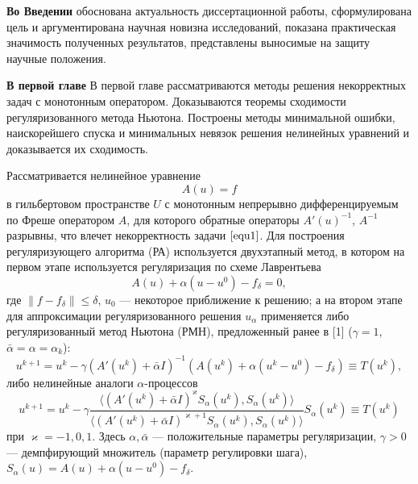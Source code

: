 \documentclass[%
autoref,     %
href,        %
facsimile,   %
colorlinks,  %
]{disser}
\begin{document}
\contribsection
\contribtext

\structsection
\structtext


\textbf{Во Введении} обоснована актуальность диссертационной работы, сформулирована цель и аргументирована научная новизна исследований, показана практическая значимость полученных результатов, представлены выносимые на защиту научные положения.

\textbf{В первой главе} В первой главе рассматриваются методы решения некорректных задач с монотонным оператором. Доказываются теоремы сходимости  регуляризованного метода Ньютона. Построены методы минимальной ошибки, наискорейшего спуска и минимальных невязок решения нелинейных уравнений и доказывается их сходимость.

Рассматривается нелинейное уравнение
\begin{equation}\label{equ1}A(u)=f\end{equation}
в гильбертовом пространстве $U$ с монотонным непрерывно дифференцируемым по Фреше оператором $A$, для которого обратные операторы $A'(u)^{-1}$, $A^{-1}$ разрывны, что влечет некорректность задачи $\eqref{equ1}$. Для построения регуляризующего алгоритма (РА) используется двухэтапный метод, в котором на первом этапе используется регуляризация по схеме Лаврентьева
\begin{equation}\label{equ2}A(u)+\alpha(u-u^0)-f_\delta=0,\end{equation}
где $\|f-f_\delta\|\le\delta$, $u_0$ --- некоторое приближение к решению; а на втором этапе для аппроксимации регуляризованного решения $u_\alpha$ применяется либо регуляризованный метод Ньютона (РМН), предложенный ранее в [1] ($\gamma=1$, $\bar{\alpha}=\alpha=\alpha_k$):
\begin{equation}\label{equ_rmn}
u^{k+1}=u^k-\gamma(A'(u^k)+\bar\alpha I)^{-1}(A(u^k)+\alpha(u^k-u^0)-f_\delta)\equiv{T(u^k)},
\end{equation}
либо нелинейные аналоги $\alpha$-процессов
\begin{equation}\label{equ_alphaproc}
u^{k+1}=u^k-\gamma\frac{\langle (A'(u^k)+\bar\alpha I)^{\varkappa}S_\alpha(u^k), S_\alpha(u^k)\rangle }{\langle(A'(u^k)+\bar\alpha I)^{\varkappa+1}S_\alpha(u^k), S_\alpha(u^k)\rangle }S_\alpha(u^k)\equiv{T(u^k)}
\end{equation}
при $\varkappa=-1,0,1$. Здесь $\alpha, \bar\alpha$ --- положительные параметры регуляризации, $\gamma>0$ --- демпфирующий множитель (параметр регулировки шага), $S_\alpha(u)=A(u)+\alpha(u-u^0)-f_\delta$.
\end{document}
